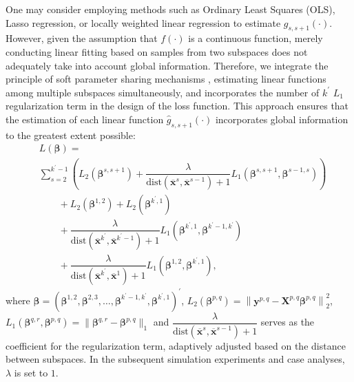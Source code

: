 \documentclass[lettersize,journal]{IEEEtran}
\begin{document}
One may consider employing methods such as Ordinary Least Squares 
(OLS), Lasso regression, or locally weighted linear regression to 
estimate $g_{s,s+1}(\cdot)$. 
However, given the assumption that $f(\cdot)$ is a continuous 
function, merely conducting linear fitting based on samples from 
two subspaces does not adequately take into account global 
information. Therefore, we integrate the principle of soft 
parameter sharing mechanisms \cite{bib70,bib71}, estimating linear functions 
among multiple subspaces simultaneously, and incorporates the number of $k^\prime$ 
$L_1$ regularization term in the design of the loss function. This approach ensures that the estimation of each linear function 
$\hat{g}_{s,s+1}(\cdot)$ incorporates global information to the 
greatest extent possible:
\begin{equation} 
\label{eq8}
\begin{aligned}
&L(\boldsymbol{\beta})= \\
&\sum\limits_{s=2}^{k^\prime-1}
\left(L_2(\boldsymbol{\beta}^{s,s+1})+\dfrac{\lambda}
{\text{dist}(\overline{\boldsymbol{x}}^{s},
\overline{\boldsymbol{x}}^{s-1})+1} 
L_1(\boldsymbol
{\beta}^{s,s+1},\boldsymbol{\beta}^{s-1,s}) \right) \\
&\qquad+L_2(\boldsymbol{\beta}^{1,2})+L_2(\boldsymbol{\beta}
^{k^\prime,1}) \\
&\qquad+\dfrac{\lambda}{\text{dist}(
  \overline{\boldsymbol{x}}^{k^\prime},\overline
  {\boldsymbol{x}}^{k^\prime-1})+1}L_1(\boldsymbol{\beta}^{k^\prime,1},
  \boldsymbol{\beta}^{k^\prime-1,k^\prime})\\
&\qquad+\dfrac{\lambda}{\text{dist}(
\overline{\boldsymbol{x}}^{k^\prime},\overline
{\boldsymbol{x}}^{1})+1}L_1(\boldsymbol{\beta}^{1,2},
\boldsymbol{\beta}^{k^\prime,1}), 
\end{aligned}
\end{equation}
where $\boldsymbol{\beta}=\left(\boldsymbol{\beta}
^{1,2},\boldsymbol{\beta}^{2,3},\ldots,\boldsymbol
{\beta}^{k^\prime-1,k^\prime},\boldsymbol{\beta}^
{k^\prime,1}\right)^\prime$, $L_2(\boldsymbol{\beta}
^{p,q})=\left\|\boldsymbol{y}^{p, q}-\boldsymbol{X}^{p, q} 
\boldsymbol{\beta}^{p, q}\right\|_{2}^{2}$, 
$L_1(\boldsymbol{\beta}^{q,r},\boldsymbol{\beta}^
{p,q})=\|\boldsymbol{\beta}^{q,r}-\boldsymbol{\beta}
^{p,q}\|_1$ and $\dfrac{\lambda}{\text{dist}(
\overline{\boldsymbol{x}}^{s},\overline{\boldsymbol{x}}
^{s-1})+1}$ serves as the coefficient for the 
regularization term, adaptively adjusted based on 
the distance between subspaces. In the subsequent 
simulation experiments and case analyses, $\lambda$ 
is set to $1$.
\end{document}
